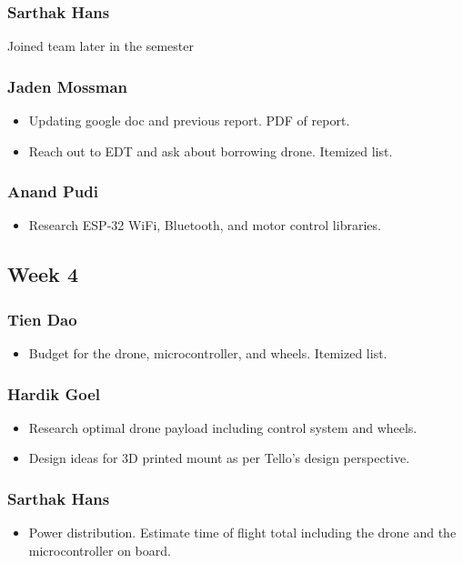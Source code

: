 \documentclass[12pt]{article}
\begin{document}
            \subsubsection*{Sarthak Hans}
                Joined team later in the semester
            \subsubsection*{Jaden Mossman}
                \begin{itemize}
                    \item Updating google doc and previous report. PDF of report.
                    \item Reach out to EDT and ask about borrowing drone. Itemized list.
                \end{itemize}
            \subsubsection*{Anand Pudi}
                \begin{itemize}
                    \item Research ESP-32 WiFi, Bluetooth, and motor control libraries.
                \end{itemize}
        \subsection*{Week 4}
            \subsubsection*{Tien Dao}
                \begin{itemize}
                    \item Budget for the drone, microcontroller, and wheels. Itemized list.
                \end{itemize}
            \subsubsection*{Hardik Goel}
                \begin{itemize}
                    \item Research optimal drone payload including control system and wheels.
                    \item Design ideas for 3D printed mount as per Tello's design perspective.
                \end{itemize}
            \subsubsection*{Sarthak Hans}
                \begin{itemize}
                    \item Power distribution. Estimate time of flight total including the drone and the microcontroller on board.
                \end{itemize}
\end{document}
